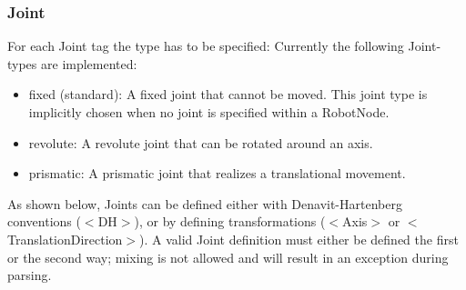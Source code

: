 \documentclass{book}
\begin{document}
\begin{figure}[H]
\end{figure}

\subsubsection{Joint}
For each Joint tag the type has to be specified: Currently the following Joint-types are implemented:
\begin{itemize}
\item fixed (standard): A fixed joint that cannot be moved. This joint type is implicitly chosen when no joint is specified within a RobotNode.
\item  revolute: A revolute joint that can be rotated around an axis.
\item prismatic: A prismatic joint that realizes a translational movement. 
\end{itemize}
As shown below, Joints can be defined either with Denavit-Hartenberg conventions ($<$DH$>$), or by defining transformations ($<$Axis$>$ or $<$TranslationDirection$>$). A valid Joint definition must either be defined the first or the second way; mixing is not allowed and will result in an exception during parsing.
\par
\end{document}
